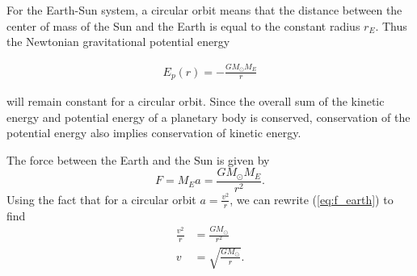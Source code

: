 \documentclass[../main.tex]{subfiles}
\begin{document}
For the Earth-Sun system, a circular orbit means that the distance between the center of mass of the Sun and the Earth is equal to the constant radius $r_E$. Thus the Newtonian gravitational potential energy

\begin{align}
    E_p(r) = -\frac{G M_\odot M_E}{r}
\end{align}

will remain constant for a circular orbit. Since the overall sum of the kinetic energy and potential energy of a planetary body is conserved, conservation of the potential energy also implies conservation of kinetic energy.

The force between the Earth and the Sun is given by
\begin{equation}\label{eq:f_earth}
    F = M_E a = \frac{GM_\odot M_E}{r^2}.
\end{equation}
Using the fact that for a circular orbit $a = \frac{v^2}{r}$, we can rewrite (\ref{eq:f_earth}) to find
\begin{align}
    \frac{v^2}{r} &= \frac{GM_\odot}{r^2}\\
    v &= \sqrt{\frac{GM_\odot}{r}}.
\end{align}
\end{document}
